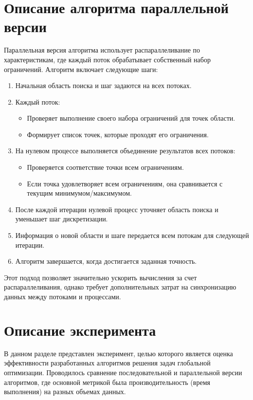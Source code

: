 \documentclass[a4paper,12pt]{article}
\begin{document}
\section*{Описание алгоритма параллельной версии}
Параллельная версия алгоритма использует распараллеливание по характеристикам, где каждый поток обрабатывает собственный набор ограничений. Алгоритм включает следующие шаги:
\begin{enumerate}
    \item Начальная область поиска и шаг задаются на всех потоках.
    \item Каждый поток:
    \begin{itemize}
        \item Проверяет выполнение своего набора ограничений для точек области.
        \item Формирует список точек, которые проходят его ограничения.
    \end{itemize}
    \item На нулевом процессе выполняется объединение результатов всех потоков:
    \begin{itemize}
        \item Проверяется соответствие точки всем ограничениям.
        \item Если точка удовлетворяет всем ограничениям, она сравнивается с текущим минимумом/максимумом.
    \end{itemize}
    \item После каждой итерации нулевой процесс уточняет область поиска и уменьшает шаг дискретизации.
    \item Информация о новой области и шаге передается всем потокам для следующей итерации.
    \item Алгоритм завершается, когда достигается заданная точность.
\end{enumerate}

Этот подход позволяет значительно ускорить вычисления за счет распараллеливания, однако требует дополнительных затрат на синхронизацию данных между потоками и процессами.
\newpage
\section*{Описание эксперимента}

В данном разделе представлен эксперимент, целью которого является оценка эффективности разработанных алгоритмов решения задач глобальной оптимизации. Проводилось сравнение последовательной и параллельной версии алгоритмов, где основной метрикой была производительность (время выполнения) на разных объемах данных.
\end{document}
